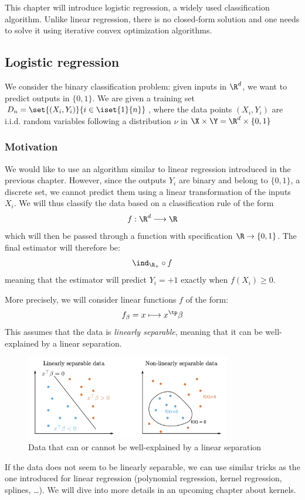 \documentclass{../cs-classes/cs-classes}
\begin{document}
This chapter will introduce logistic regression, a widely used classification algorithm. Unlike linear regression, there is no closed-form solution and one needs to solve it using iterative convex optimization algorithms.

\subsection{Logistic regression}
We consider the binary classification problem: given inputs in $\R^d$, we want to predict outputs in $\{0, 1\}$. We are given a training set $D_n=\set{(X_i, Y_i)}{i\in\iset{1}{n}}$, where the data points $(X_i, Y_i)$ are i.i.d. random variables following a distribution $\nu$ in $\X\times\Y=\R^d\times\{0, 1\}$

\subsubsection{Motivation}
We would like to use an algorithm similar to linear regression introduced in the previous chapter. However, since the outputs $Y_i$ are binary and belong to $\{0, 1\}$, a discrete set, we cannot predict them using a linear transformation of the inputs $X_i$. We will thus classify the data based on a classification rule of the form
\begin{equation*}
    f : \R^d \longrightarrow \R
\end{equation*}
which will then be passed through a function with specification $\R\to\{0, 1\}$. The final estimator will therefore be:
\begin{equation*}
    \ind_{\R_+}\circ f
\end{equation*}
meaning that the estimator will predict $Y_i=+1$ exactly when $f(X_i)\geq0$.

More precisely, we will consider linear functions $f$ of the form:
\begin{equation*}
    f_\beta = x \longmapsto x^\tp\beta
\end{equation*}
This assumes that the data is \emph{linearly separable}, meaning that it can be well-explained by a linear separation.
\begin{figure}[H]
    \centering
    \includegraphics[width=0.8\textwidth]{images/linearly-separable.png}
    \caption{Data that can or cannot be well-explained by a linear separation}
\end{figure}
If the data does not seem to be linearly separable, we can use similar tricks as the one introduced for linear regression (polynomial regression, kernel regression, splines, \dots). We will dive into more details in an upcoming chapter about kernels.
\end{document}
